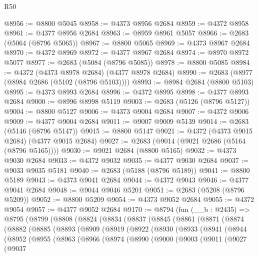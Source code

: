 \begin{lexlean}{R50}
\begin{coremodule}
@8956 := @8800 @5045
@8958 := @4373 @8956 @2684
@8959 := @4372 @8958
@8961 := @4377 @8956 @2684
@8963 := @8959 @8961 @5057
@8966 := @2683 (@5064 (@8796 @5065))
@8967 := @8800 @5065
@8969 := @4373 @8967 @2684
@8970 := @4372 @8969
@8972 := @4377 @8967 @2684
@8974 := @8970 @8972 @5077
@8977 := @2683 (@5084 (@8796 @5085))
@8978 := @8800 @5085
@8984 := @4372 (@4373 @8978 @2684) (@4377 @8978 @2684)
@8990 := @2683 (@8977 (@8984 @2686 (@5102 (@8796 @5103))))
@8993 := @8984 @2684 (@8800 @5103)
@8995 := @4373 @8993 @2684
@8996 := @4372 @8995
@8998 := @4377 @8993 @2684
@9000 := @8996 @8998 @5119
@9003 := @2683 (@5126 (@8796 @5127))
@9004 := @8800 @5127
@9006 := @4373 @9004 @2684
@9007 := @4372 @9006
@9009 := @4377 @9004 @2684
@9011 := @9007 @9009 @5139
@9014 := @2683 (@5146 (@8796 @5147))
@9015 := @8800 @5147
@9021 := @4372 (@4373 @9015 @2684) (@4377 @9015 @2684)
@9027 := @2683 (@9014 (@9021 @2686 (@5164 (@8796 @5165))))
@9030 := @9021 @2684 (@8800 @5165)
@9032 := @4373 @9030 @2684
@9033 := @4372 @9032
@9035 := @4377 @9030 @2684
@9037 := @9033 @9035 @5181
@9040 := @2683 (@5188 (@8796 @5189))
@9041 := @8800 @5189
@9043 := @4373 @9041 @2684
@9044 := @4372 @9043
@9046 := @4377 @9041 @2684
@9048 := @9044 @9046 @5201
@9051 := @2683 (@5208 (@8796 @5209))
@9052 := @8800 @5209
@9054 := @4373 @9052 @2684
@9055 := @4372 @9054
@9057 := @4377 @9052 @2684
@9170 := @8794
    (fun (__b : @2435) =>
    @8795
      (@8799
        (@8808
          (@8824
            (@8834
              (@8837
                (@8845
                  (@8861
                    (@8871
                      (@8874
                        (@8882
                          (@8885
                            (@8893
                              (@8909
                                (@8919
                                  (@8922
                                    (@8930
                                      (@8933
                                        (@8941
                                          (@8944
                                            (@8952
                                              (@8955
                                                (@8963
                                                  (@8966
                                                    (@8974
                                                      (@8990
                                                        (@9000
                                                          (@9003
                                                            (@9011
                                                              (@9027
                                                                (@9037

\end{coremodule}
\end{lexlean}
